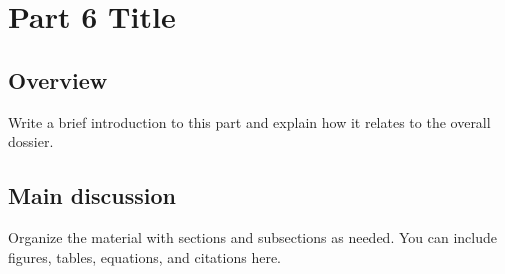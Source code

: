\chapter{Part 6 Title}

\section{Overview}
Write a brief introduction to this part and explain how it relates to the overall dossier.

\section{Main discussion}
Organize the material with sections and subsections as needed. You can include
figures, tables, equations, and citations here.


